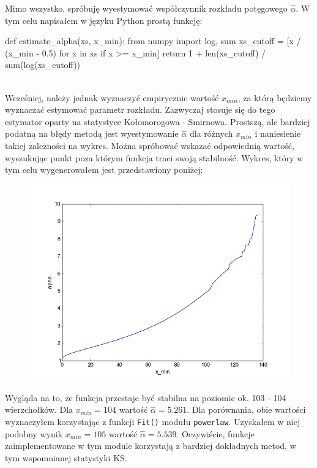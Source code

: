 \documentclass[a4paper,10pt]{article}
\begin{document}
		Mimo wszystko, spróbuję wyestymować współczynnik rozkładu potęgowego $\hat{\alpha}$. W tym celu napisałem w języku Python prostą funkcję:\\\linebreak
		\begin{verbbox}
			def estimate_alpha(xs, x_min):
	    		from numpy import log, sum
	    		xs_cutoff = [x / (x_min - 0.5) for x in xs if x >= x_min]
	    		return 1 + len(xs_cutoff) / sum(log(xs_cutoff))
		\end{verbbox}
		\fbox{\theverbbox}
		\\\hfill
		Wcześniej, należy jednak wyznaczyć empirycznie wartość $x_{min}$, za którą będziemy wyznaczać estymować parametr rozkładu. Zazwyczaj stosuje się do tego estymator oparty na statystyce Kołomorogowa - Smirnowa. Prostszą, ale bardziej podatną na błędy metodą jest wyestymowanie $\hat{\alpha}$ dla różnych $x_{min}$ i naniesienie takiej zależności na wykres. Można spróbować wskazać odpowiednią wartość, wyszukując punkt poza którym funkcja traci swoją stabilność. Wykres, który w tym celu wygenerowałem jest przedstawiony poniżej:\\\linebreak
		\begin{figure}[H]
			\centering
			\hfill\includegraphics[width=\linewidth]{figure_3}
		\end{figure}

		Wygląda na to, że funkcja przestaje być stabilna na poziomie ok. 103 - 104 wierzchołków. Dla $x_{min} = 104$ wartość $\hat{\alpha} = 5.261$. Dla porównania, obie wartości wyznaczyłem korzystając z funkcji \texttt{Fit()} modułu \texttt{powerlaw}. Uzyskałem w niej podobny wynik $x_{min} = 105$ wartość $\hat{\alpha} = 5.539$. Oczywiście, funkcje zaimplementowane w tym module korzystają z bardziej dokładnych metod, w tym wspomnianej statystyki KS.
\end{document}
